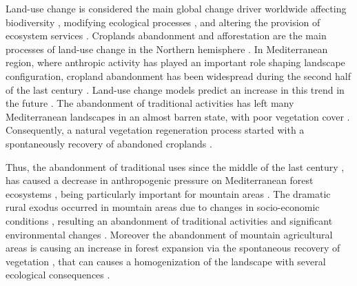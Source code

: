 Land-use change is considered the main global change driver worldwide \autocites{Butchartetal2010GlobalBiodiversity,Winkleretal2021GlobalLand} affecting biodiversity \autocites{Sala2000GlobalBiodiversity}, modifying ecological processes \autocites{Lindenmayeretal2012LandUse}, and altering the provision of ecosystem services \autocites{Hasanetal2020ImpactLand}. Croplands abandonment and afforestation are the main processes of land-use change in the Northern hemisphere \autocites{Winkleretal2021GlobalLand,ReyBenayas2007AbandonmentAgricultural}. In Mediterranean region, where anthropic activity has played an important role shaping landscape configuration, cropland abandonment has been widespread during the second half of the last century \autocites{Piasetal2014ColonizationAbandoned,ValbuenaCarabanaetal2010HistoricalRecent,MartinezFernandezetal2015RecentLand}. Land-use change models predict an increase in this trend in the future \autocites{Rounsevelletal2006CoherentSet,PerpinaCastilloetal2021ModellingAgricultural}. The abandonment of traditional activities has left many Mediterranean landscapes in an almost barren state, with poor vegetation cover \autocites{Sheffer2012ReviewDevelopment, ReyBenayas2007AbandonmentAgricultural}. Consequently, a natural vegetation regeneration process started with a spontaneously recovery of abandoned croplands \autocites{Debusscheetal1999MediterraneanLandscape,PenuelasBoada2003GlobalChangeinduced,AlvarezMartinezetal2014InfluenceLand,Nataleetal2007StudyTree,Piussi2000ExpansionEuropean}. 

Thus, the abandonment of traditional uses since the middle of the last century \autocites{MacDonaldetal2000AgriculturalAbandonment}, has caused a decrease in anthropogenic pressure on Mediterranean forest ecosystems \autocites{ValbuenaCarabanaetal2010HistoricalRecent}, being particularly important for mountain areas \autocites{Nataleetal2007StudyTree, AlvarezMartinezetal2014InfluenceLand,JimenezOlivenciaetal2015MedioSiglo,Piasetal2014ColonizationAbandoned}. The dramatic rural exodus occurred in mountain areas due to changes in socio-economic conditions \autocites{EuropeanEnvironmentAgency2010EuropeEcological}, resulting an abandonment of traditional activities and significant environmental changes \autocites{MacDonaldetal2000AgriculturalAbandonment, Nataleetal2007StudyTree, AlvarezMartinezetal2014InfluenceLand,Piussi2000ExpansionEuropean,Rutherfordetal2008AssessingLanduse,Zimmermannetal2010EffectsLanduse}. Moreover the abandonment of mountain agricultural areas is causing an increase in forest expansion via the spontaneous recovery of vegetation \autocites{Piussi2000ExpansionEuropean, AlvarezMartinezetal2014InfluenceLand}, that can causes a homogenization of the landscape \autocites{Mietkiewiczetal2017LongtermChange} with several ecological consequences \autocites{Zimmermannetal2010EffectsLanduse}. 

